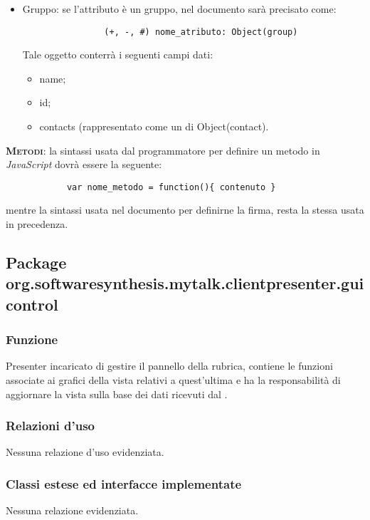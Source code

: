\begin{description}
\begin{itemize}
\item Gruppo: se l'attributo è un gruppo, nel documento sarà precisato come:
			
			\begin{verbatim}
				(+, -, #) nome_atributo: Object(group)
			\end{verbatim}
			Tale oggetto conterrà i seguenti campi dati:
			\begin{itemize}
			\item name;
			\item id;
			\item contacts (rappresentato come un  di Object(contact).
			\end{itemize}
		\end{itemize}
	\item{\scshape\bfseries Metodi}: la sintassi usata dal programmatore per definire un metodo in \textit{JavaScript} dovrà essere la seguente:
		\begin{verbatim}
			var nome_metodo = function(){ contenuto }
		\end{verbatim}
		
		mentre la sintassi usata nel documento per definirne la firma, resta la stessa usata in precedenza.
	
\end{description}

\subsection{Package org.softwaresynthesis.mytalk.clientpresenter.guicontrol}\label{sec:guicontrol}


\subsubsection*{Funzione}
Presenter incaricato di gestire il pannello della rubrica, contiene le funzioni associate ai  grafici della vista relativi a quest'ultima e ha la responsabilità di aggiornare la vista sulla base dei dati ricevuti dal .

\subsubsection*{Relazioni d'uso}
Nessuna relazione d'uso evidenziata.

\subsubsection*{Classi estese ed interfacce implementate}
Nessuna relazione evidenziata.

